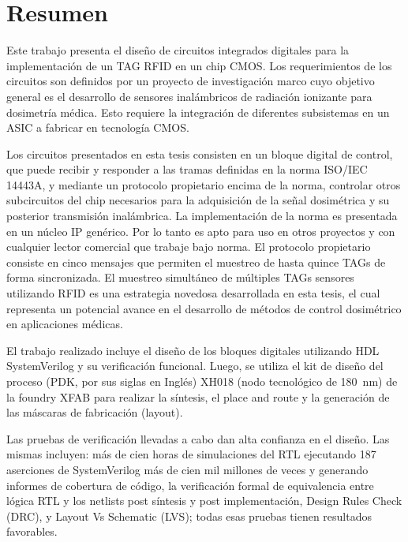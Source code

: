 \documentclass[a4paper, twoside, 11pt]{report}
\begin{document}

\FloatBarrier
\chapter*{Resumen}
Este trabajo presenta el diseño de circuitos integrados digitales para la implementación de un TAG RFID en un chip CMOS. Los requerimientos de los circuitos son definidos por un proyecto de investigación marco cuyo objetivo general es el desarrollo de sensores inalámbricos de radiación ionizante para dosimetría médica. Esto requiere la integración de diferentes subsistemas en un ASIC a fabricar en tecnología CMOS.

Los circuitos presentados en esta tesis consisten en un bloque digital de control, que puede recibir y responder a las tramas definidas en la norma ISO/IEC 14443A, y mediante un protocolo propietario encima de la norma, controlar otros subcircuitos del chip necesarios para la adquisición de la señal dosimétrica y su posterior transmisión inalámbrica. La implementación de la norma es presentada en un núcleo IP genérico. Por lo tanto es apto para uso en otros proyectos y con cualquier lector comercial que trabaje bajo norma. El protocolo propietario consiste en cinco mensajes que permiten el muestreo de hasta quince TAGs de forma sincronizada. El muestreo simultáneo de múltiples TAGs sensores utilizando RFID es una estrategia novedosa desarrollada en esta tesis, el cual representa un potencial avance en el desarrollo de métodos de control dosimétrico en aplicaciones médicas.

El trabajo realizado incluye el diseño de los bloques digitales utilizando HDL SystemVerilog y su verificación funcional. Luego, se utiliza el kit de diseño del proceso (PDK, por sus siglas en Inglés) XH018 (nodo tecnológico de \SI{180}{\nano\meter}) de la foundry XFAB para realizar la síntesis, el place and route y la generación de las máscaras de fabricación (layout).

Las pruebas de verificación llevadas a cabo dan alta confianza en el diseño. Las mismas incluyen: más de cien horas de simulaciones del RTL ejecutando 187 aserciones de SystemVerilog más de cien mil millones de veces y generando informes de cobertura de código, la verificación formal de equivalencia entre lógica RTL y los netlists post síntesis y post implementación, Design Rules Check (DRC), y Layout Vs Schematic (LVS); todas esas pruebas tienen resultados favorables.
\end{document}
